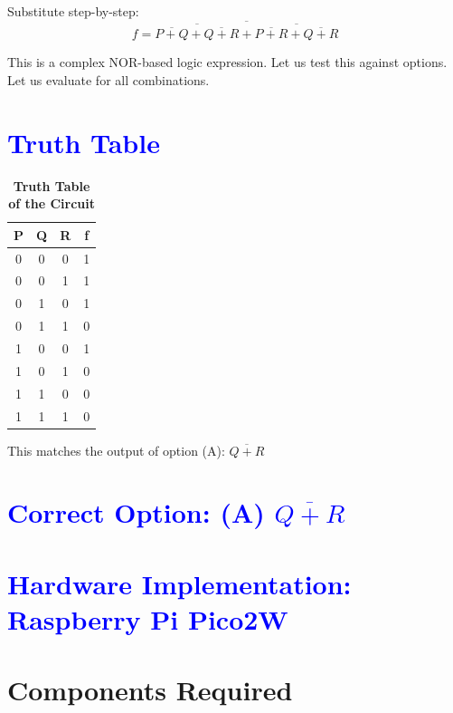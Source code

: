 \documentclass[twocolumn]{article}
\begin{document}
Substitute step-by-step:
\[
f = \overline{
\overline{ \overline{P + Q} + \overline{Q + R} } + 
\overline{ \overline{P + R} + \overline{Q + R} }
}
\]

This is a complex NOR-based logic expression. Let us test this against options. Let us evaluate for all combinations.

\section*{\textcolor{blue}{Truth Table}}

\begin{table}[h]
\centering
\renewcommand{\arraystretch}{1.2}
\begin{tabular}{|c|c|c|c|}
\hline
P & Q & R & f \\
\hline
0 & 0 & 0 & 1 \\
0 & 0 & 1 & 1 \\
0 & 1 & 0 & 1 \\
0 & 1 & 1 & 0 \\
1 & 0 & 0 & 1 \\
1 & 0 & 1 & 0 \\
1 & 1 & 0 & 0 \\
1 & 1 & 1 & 0 \\
\hline
\end{tabular}
\caption*{\textbf{Truth Table of the Circuit}}
\end{table}

This matches the output of option (A): $\overline{Q + R}$

\section*{\textcolor{blue}{Correct Option: (A) $\overline{Q + R}$}}

\section*{\textcolor{blue}{Hardware Implementation: Raspberry Pi Pico2W}}
\section*{{Components Required}}
\end{document}
